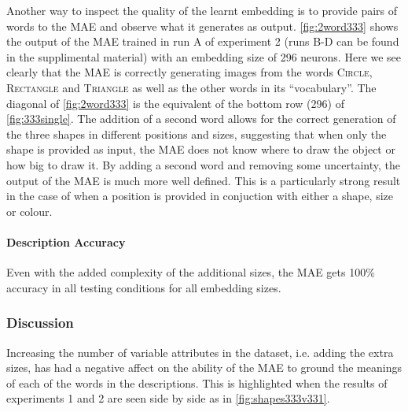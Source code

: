 Another way to inspect the quality of the learnt embedding is to provide pairs of words to the \ac{MAE} and observe what it generates as output. \autoref{fig:2word333} shows the output of the \ac{MAE} trained in run A of experiment 2 (runs B-D can be found in the supplimental material) with an embedding size of 296 neurons. Here we see clearly that the \ac{MAE} is correctly generating images from the words \textsc{Circle}, \textsc{Rectangle} and \textsc{Triangle} as well as the other words in its ``vocabulary''. The diagonal of \autoref{fig:2word333} is the equivalent of the bottom row (296) of \autoref{fig:333single}. The addition of a second word allows for the correct generation of the three shapes in different positions and sizes, suggesting that when only the shape is provided as input, the \ac{MAE} does not know where to draw the object or how big to draw it. By adding a second word and removing some uncertainty, the output of the \ac{MAE} is much more well defined. This is a particularly strong result in the case of when a position is provided in conjuction with either a shape, size or colour. 


\paragraph{Description Accuracy}
Even with the added complexity of the additional sizes, the MAE gets 100\% accuracy in all testing conditions for all embedding sizes. 


\subsubsection{Discussion}

Increasing the number of variable attributes in the dataset, i.e. adding the extra sizes, has had a negative affect on the ability of the \ac{MAE} to ground the meanings of each of the words in the descriptions. This is highlighted when the results of experiments 1 and 2 are seen side by side as in \autoref{fig:shapes333v331}. 

